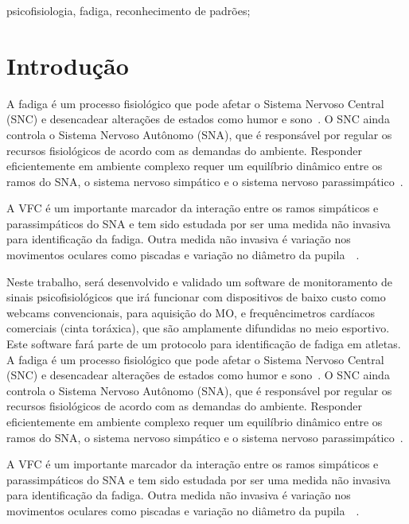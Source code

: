\documentclass[10pt, conference, compsocconf]{IEEEtran}
\begin{document}
\begin{IEEEkeywords}
psicofisiologia, fadiga, reconhecimento de padrões; 

\end{IEEEkeywords}
 
\IEEEpeerreviewmaketitle

\section{Introdução}
  
	A fadiga é um processo fisiológico que pode afetar o Sistema Nervoso Central (SNC) e desencadear alterações de estados como humor e sono~\cite{Budgett1998}. O SNC ainda controla o Sistema Nervoso Autônomo (SNA), que é responsável por regular os recursos fisiológicos de acordo com as demandas do ambiente. Responder eficientemente em ambiente complexo requer um equilíbrio dinâmico entre os ramos do SNA, o sistema nervoso simpático e o sistema nervoso parassimpático~\cite{Thayer2009}. 
	
	A VFC é um importante marcador da interação entre os ramos simpáticos e parassimpáticos do SNA e tem sido estudada por ser uma medida não invasiva para identificação da fadiga. Outra medida não invasiva é variação nos movimentos oculares como piscadas e variação no diâmetro da pupila~\cite{Zhu2004}~\cite{Noor2009}.  
	 
 	Neste trabalho, será desenvolvido e validado um software de monitoramento de sinais psicofisiológicos que irá funcionar com dispositivos de baixo custo como webcams convencionais, para aquisição do MO, e frequêncimetros cardíacos comerciais (cinta toráxica), que são amplamente difundidas no meio esportivo. Este software fará parte de um protocolo para identificação de fadiga em atletas.
	A fadiga é um processo fisiológico que pode afetar o Sistema Nervoso Central (SNC) e desencadear alterações de estados como humor e sono~\cite{Budgett1998}. O SNC ainda controla o Sistema Nervoso Autônomo (SNA), que é responsável por regular os recursos fisiológicos de acordo com as demandas do ambiente. Responder eficientemente em ambiente complexo requer um equilíbrio dinâmico entre os ramos do SNA, o sistema nervoso simpático e o sistema nervoso parassimpático~\cite{Thayer2009}. 
	
	A VFC é um importante marcador da interação entre os ramos simpáticos e parassimpáticos do SNA e tem sido estudada por ser uma medida não invasiva para identificação da fadiga. Outra medida não invasiva é variação nos movimentos oculares como piscadas e variação no diâmetro da pupila~\cite{Zhu2004}~\cite{Noor2009}.  
	 
\end{document}
